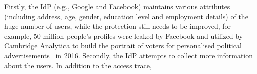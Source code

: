 Firstly, the IdP (e.g., Google and Facebook) maintains various attributes (including address, age, gender, education level and employment details) of the huge number of users, while the protection still needs to be improved, for example, 50 million people's profiles were leaked by Facebook and utilized by Cambridge Analytica to build the portrait of voters for personalised political advertisements~\cite{facebooknews} in 2016. Secondly, the IdP attempts to collect more information about the users. In addition to the access trace,





